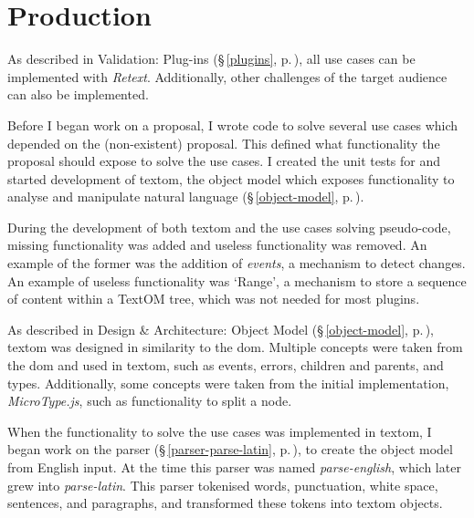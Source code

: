 
\begingroup
\let\clearpage\relax
\let\cleardoublepage\relax
\let\cleardoublepage\relax

\manualmark
{}

\chapter*{Production}\label{addendum-production}

As described in Validation: Plug-ins (§\,\ref{plugins},
  p.\,\pageref{plugins}), all use cases can be implemented with \emph{Retext}.
Additionally, other challenges of the target audience can also be
  implemented.

Before I began work on a proposal, I wrote code to solve several use cases
  which depended on the (non-existent) proposal.
This defined what functionality the proposal should expose to solve the use
  cases.
I created the unit tests for and started development of \gls{textom},
  the object model which exposes functionality to analyse and manipulate
  natural language (§\,\ref{object-model}, p.\,\pageref{object-model}).

During the development of both \gls{textom} and the use cases solving
  pseudo-code, missing functionality was added and useless functionality was
  removed.
An example of the former was the addition of \emph{events}, a mechanism to
  detect changes.
An example of useless functionality was `Range', a mechanism to store a
  sequence of content within a TextOM tree, which was not needed for
  most plugins.

As described in Design \& Architecture: Object Model (§\,\ref{object-model},
  p.\,\pageref{object-model}), \gls{textom} was designed in similarity to the
  \gls{dom}.
Multiple concepts were taken from the \gls{dom} and used in \gls{textom},
  such as events, errors, children and parents, and types.
Additionally, some concepts were taken from the initial implementation,
  \emph{MicroType.js}, such as functionality to split a node.

When the functionality to solve the use cases was implemented in \gls{textom},
  I began work on the parser (§\,\ref{parser-parse-latin},
  p.\,\pageref{parser-parse-latin}), to create the object model from
  English input.
At the time this parser was named \emph{parse-english}, which later grew into
  \emph{parse-latin}.
This parser tokenised words, punctuation, white space, sentences, and
  paragraphs, and transformed these tokens into \gls{textom} objects.

